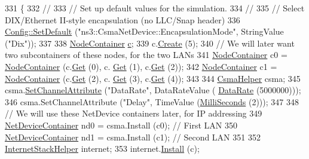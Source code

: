 \begin{DoxyCode}
331 \{
332   \textcolor{comment}{//}
333   \textcolor{comment}{// Set up default values for the simulation.}
334   \textcolor{comment}{//}
335   \textcolor{comment}{// Select DIX/Ethernet II-style encapsulation (no LLC/Snap header)}
336   \hyperlink{group__config_ga2e7882df849d8ba4aaad31c934c40c06}{Config::SetDefault} (\textcolor{stringliteral}{"ns3::CsmaNetDevice::EncapsulationMode"}, StringValue (\textcolor{stringliteral}{"Dix"}));
337 
338   \hyperlink{classns3_1_1NodeContainer}{NodeContainer} \hyperlink{lte_2model_2fading-traces_2fading__trace__generator_8m_ae0323a9039add2978bf5b49550572c7c}{c};
339   c.\hyperlink{classns3_1_1NodeContainer_a787f059e2813e8b951cc6914d11dfe69}{Create} (5);
340   \textcolor{comment}{// We will later want two subcontainers of these nodes, for the two LANs}
341   \hyperlink{classns3_1_1NodeContainer}{NodeContainer} c0 = \hyperlink{classns3_1_1NodeContainer}{NodeContainer} (c.\hyperlink{classns3_1_1NodeContainer_a9ed96e2ecc22e0f5a3d4842eb9bf90bf}{Get} (0), c.
      \hyperlink{classns3_1_1NodeContainer_a9ed96e2ecc22e0f5a3d4842eb9bf90bf}{Get} (1), c.\hyperlink{classns3_1_1NodeContainer_a9ed96e2ecc22e0f5a3d4842eb9bf90bf}{Get} (2));
342   \hyperlink{classns3_1_1NodeContainer}{NodeContainer} c1 = \hyperlink{classns3_1_1NodeContainer}{NodeContainer} (c.\hyperlink{classns3_1_1NodeContainer_a9ed96e2ecc22e0f5a3d4842eb9bf90bf}{Get} (2), c.
      \hyperlink{classns3_1_1NodeContainer_a9ed96e2ecc22e0f5a3d4842eb9bf90bf}{Get} (3), c.\hyperlink{classns3_1_1NodeContainer_a9ed96e2ecc22e0f5a3d4842eb9bf90bf}{Get} (4));
343 
344   \hyperlink{classns3_1_1CsmaHelper}{CsmaHelper} csma;
345   csma.\hyperlink{classns3_1_1CsmaHelper_a886d900b2fe44433e0b81752dea7e7f1}{SetChannelAttribute} (\textcolor{stringliteral}{"DataRate"}, DataRateValue (
      \hyperlink{classns3_1_1DataRate}{DataRate} (5000000)));
346   csma.SetChannelAttribute (\textcolor{stringliteral}{"Delay"}, TimeValue (\hyperlink{group__timecivil_gaf26127cf4571146b83a92ee18679c7a9}{MilliSeconds} (2)));
347  
348   \textcolor{comment}{// We will use these NetDevice containers later, for IP addressing}
349   \hyperlink{classns3_1_1NetDeviceContainer}{NetDeviceContainer} nd0 = csma.Install (c0);  \textcolor{comment}{// First LAN}
350   \hyperlink{classns3_1_1NetDeviceContainer}{NetDeviceContainer} nd1 = csma.Install (c1);  \textcolor{comment}{// Second LAN}
351 
352   \hyperlink{classns3_1_1InternetStackHelper}{InternetStackHelper} internet;
353   internet.\hyperlink{classns3_1_1InternetStackHelper_a6645b412f31283d2d9bc3d8a95cebbc0}{Install} (c);

\end{DoxyCode}
